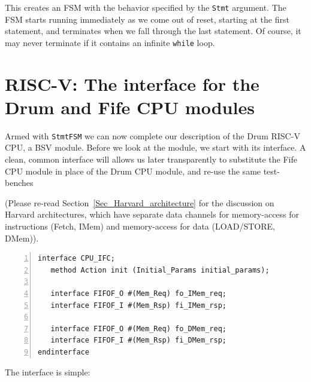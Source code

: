 This creates an FSM with the behavior specified by the \verb|Stmt|
argument.  The FSM starts running immediately as we come out of reset,
starting at the first statement, and terminates when we fall through
the last statement.  Of course, it may never terminate if it contains
an infinite {\tt while} loop.


\section{RISC-V: The interface for the Drum and Fife CPU modules}

\label{Sec_Drum_CPU_interface}

Armed with {\tt StmtFSM} we can now complete our description of the
Drum RISC-V CPU, a BSV module.  Before we look at the module, we start
with its interface.  A clean, common interface will allows us later
transparently to substitute the Fife CPU module in place of the Drum
CPU module, and re-use the same test-benches {\etc}


(Please re-read Section~\ref{Sec_Harvard_architecture} for the
discussion on Harvard architectures, which have separate data channels
for memory-access for instructions (Fetch, IMem) and memory-access for
data (LOAD/STORE, DMem)).

{\small
\begin{Verbatim}[frame=single, numbers=left]
interface CPU_IFC;
   method Action init (Initial_Params initial_params);

   interface FIFOF_O #(Mem_Req) fo_IMem_req;
   interface FIFOF_I #(Mem_Rsp) fi_IMem_rsp;

   interface FIFOF_O #(Mem_Req) fo_DMem_req;
   interface FIFOF_I #(Mem_Rsp) fi_DMem_rsp;
endinterface
\end{Verbatim}
}

The interface is simple:

